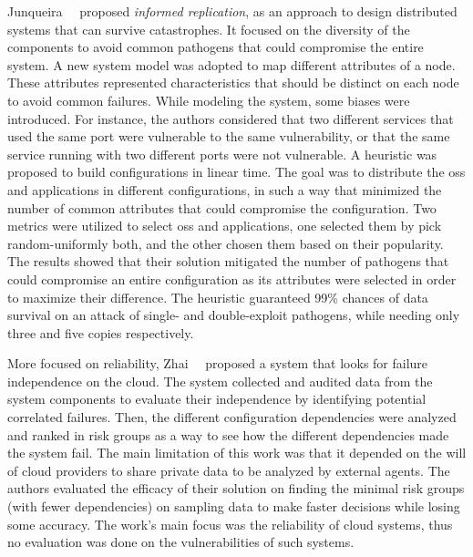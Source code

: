 Junqueira~\etal{}~\cite{Junqueira:2005} proposed \emph{informed replication}, as an approach to design distributed systems that can survive catastrophes.
It focused on the diversity of the components to avoid common pathogens that could compromise the entire system.
A new system model was adopted to map different attributes of a node. 
These attributes represented characteristics that should be distinct on each node to avoid common failures.
While modeling the system, some biases were introduced.
For instance, the authors considered that two different services that used the same port were vulnerable to the same vulnerability, or that the same service running with two different ports were not vulnerable.
A heuristic was proposed to build configurations in linear time.
The goal was to distribute the \glspl{os} and applications in different configurations, in such a way that minimized the number of common attributes that could compromise the configuration.
Two metrics were utilized to select \glspl{os} and applications, one selected them by pick random-uniformly both, and the other chosen them based on their popularity.
The results showed that their solution mitigated the number of pathogens that could compromise an entire configuration as its attributes were selected in order to maximize their difference.
The heuristic guaranteed 99\% chances of data survival on an attack of single- and double-exploit pathogens, while needing only three and five copies respectively.


More focused on reliability, Zhai~\etal{}~\cite{Zhai:2014} proposed a system that looks for failure independence on the cloud.
The system collected and audited data from the system components to evaluate their independence by identifying potential correlated failures.
Then, the different configuration dependencies were analyzed and ranked in risk groups as a way to see how the different dependencies made the system fail.
The main limitation of this work was that it depended on the will of cloud providers to share private data to be analyzed by external agents.
The authors evaluated the efficacy of their solution on finding the minimal risk groups (with fewer dependencies) on sampling data to make faster decisions while losing some accuracy.
The work's main focus was the reliability of cloud systems, thus no evaluation was done on the vulnerabilities of such systems.

